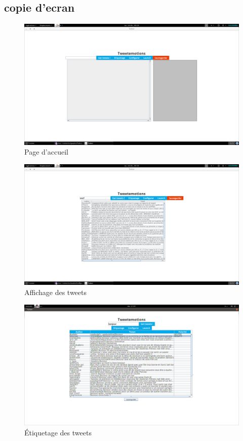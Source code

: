 \documentclass[a4paper,10pt]{report}
\begin{document}
    \subsection{copie d'ecran}
      \begin{figure}[H]
	\centering
	\includegraphics[scale=0.2]{impressions-ecran/accueil.png}
	\caption{Page d'accueil}
	\label{accueil}
      \end{figure}
      \begin{figure}[H]
	\centering
	\includegraphics[scale=0.2]{impressions-ecran/tweets.png}
	\caption{Affichage des tweets}
	\label{tweets}
      \end{figure}
      \begin{figure}[H]
	\centering
	\includegraphics[scale=0.2]{impressions-ecran/etiquetage.png}
	\caption{Étiquetage des tweets}
	\label{etiquetage}
      \end{figure}
\end{document}
